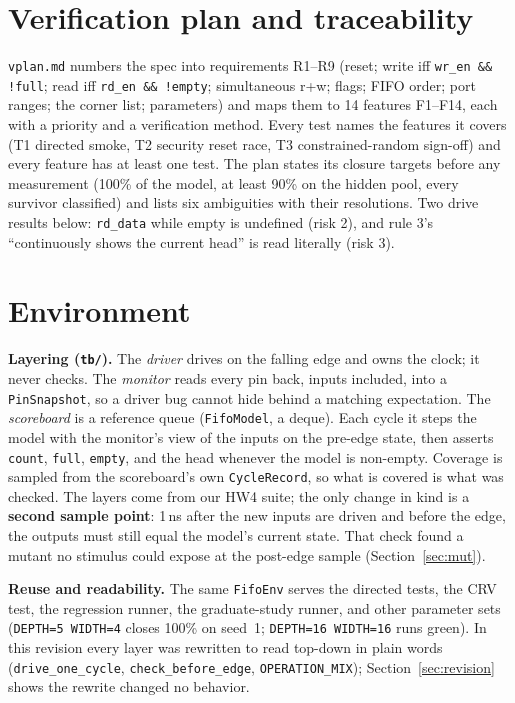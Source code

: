 \documentclass[10pt]{article}
\newcommand{\code}[1]{\texttt{#1}}
\begin{document}
\section{Verification plan and traceability}
\code{vplan.md} numbers the spec into requirements R1--R9 (reset; write iff \code{wr\_en \&\& !full}; read iff \code{rd\_en \&\& !empty}; simultaneous r+w; flags; FIFO order; port ranges; the corner list; parameters) and maps them to 14 features F1--F14, each with a priority and a verification method. Every test names the features it covers (T1 directed smoke, T2 security reset race, T3 constrained-random sign-off) and every feature has at least one test. The plan states its closure targets before any measurement (100\% of the model, at least 90\% on the hidden pool, every survivor classified) and lists six ambiguities with their resolutions. Two drive results below: \code{rd\_data} while empty is undefined (risk 2), and rule 3's ``continuously shows the current head'' is read literally (risk 3).

\section{Environment}
\textbf{Layering (\code{tb/}).} The \emph{driver} drives on the falling edge and owns the clock; it never checks. The \emph{monitor} reads every pin back, inputs included, into a \code{PinSnapshot}, so a driver bug cannot hide behind a matching expectation. The \emph{scoreboard} is a reference queue (\code{FifoModel}, a deque). Each cycle it steps the model with the monitor's view of the inputs on the pre-edge state, then asserts \code{count}, \code{full}, \code{empty}, and the head whenever the model is non-empty. Coverage is sampled from the scoreboard's own \code{CycleRecord}, so what is covered is what was checked. The layers come from our HW4 suite; the only change in kind is a \textbf{second sample point}: 1\,ns after the new inputs are driven and before the edge, the outputs must still equal the model's current state. That check found a mutant no stimulus could expose at the post-edge sample (Section~\ref{sec:mut}).

\textbf{Reuse and readability.} The same \code{FifoEnv} serves the directed tests, the CRV test, the regression runner, the graduate-study runner, and other parameter sets (\code{DEPTH=5 WIDTH=4} closes 100\% on seed~1; \code{DEPTH=16 WIDTH=16} runs green). In this revision every layer was rewritten to read top-down in plain words (\code{drive\_one\_cycle}, \code{check\_before\_edge}, \code{OPERATION\_MIX}); Section~\ref{sec:revision} shows the rewrite changed no behavior.
\end{document}
